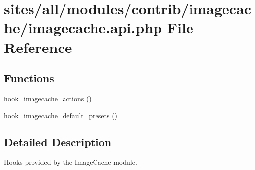 \hypertarget{imagecache_8api_8php}{
\section{sites/all/modules/contrib/imagecache/imagecache.api.php File Reference}
\label{imagecache_8api_8php}
}
\subsection*{Functions}
\begin{CompactItemize}
\item 
\hyperlink{group__hooks_gfea2ca26f6178230dca0a71ae21bef8b}{hook\_\-imagecache\_\-actions} ()
\item 
\hyperlink{group__hooks_gd1b2ea040501521cfab6683c33517998}{hook\_\-imagecache\_\-default\_\-presets} ()
\end{CompactItemize}


\subsection{Detailed Description}
Hooks provided by the ImageCache module. 